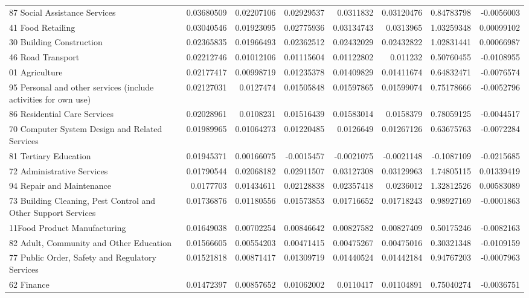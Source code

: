 \documentclass{monashthesis}
\begin{document}
\begin{table}[ht]
{\begin{tabular}{|l|r|rrrr|rr|}
    87 Social Assistance Services & 0.03680509 & 0.02207106 & 0.02929537 & 0.0311832 & 0.03120476 & 0.84783798 & -0.0056003 \\
    41 Food Retailing & 0.03040546 & 0.01923095 & 0.02775936 & 0.03134743 & 0.0313965 & 1.03259348 & 0.00099102 \\
    30 Building Construction & 0.02365835 & 0.01966493 & 0.02362512 & 0.02432029 & 0.02432822 & 1.02831441 & 0.00066987 \\
    46 Road Transport & 0.02212746 & 0.01012106 & 0.01115604 & 0.01122802 & 0.011232 & 0.50760455 & -0.0108955 \\
    01 Agriculture & 0.02177417 & 0.00998719 & 0.01235378 & 0.01409829 & 0.01411674 & 0.64832471 & -0.0076574 \\
    95 Personal and other services (include activities for own use) & 0.02127031 & 0.0127474 & 0.01505848 & 0.01597865 & 0.01599074 & 0.75178666 & -0.0052796 \\
    86 Residential Care Services & 0.02028961 & 0.0108231 & 0.01516439 & 0.01583014 & 0.0158379 & 0.78059125 & -0.0044517 \\
    70 Computer System Design and Related Services & 0.01989965 & 0.01064273 & 0.01220485 & 0.0126649 & 0.01267126 & 0.63675763 & -0.0072284 \\
    81 Tertiary Education & 0.01945371 & 0.00166075 & -0.0015457 & -0.0021075 & -0.0021148 & -0.1087109 & -0.0215685 \\
    72 Administrative Services & 0.01790544 & 0.02068182 & 0.02911507 & 0.03127308 & 0.03129963 & 1.74805115 & 0.01339419 \\
    94 Repair and Maintenance & 0.0177703 & 0.01434611 & 0.02128838 & 0.02357418 & 0.0236012 & 1.32812526 & 0.00583089 \\
    73 Building Cleaning, Pest Control and Other Support Services & 0.01736876 & 0.01180556 & 0.01573853 & 0.01716652 & 0.01718243 & 0.98927169 & -0.0001863 \\
    11Food Product Manufacturing & 0.01649038 & 0.00702254 & 0.00846642 & 0.00827582 & 0.00827409 & 0.50175246 & -0.0082163 \\
    82 Adult, Community and Other Education & 0.01566605 & 0.00554203 & 0.00471415 & 0.00475267 & 0.00475016 & 0.30321348 & -0.0109159 \\
    77 Public Order, Safety and Regulatory Services & 0.01521818 & 0.00871417 & 0.01309719 & 0.01440524 & 0.01442184 & 0.94767203 & -0.0007963 \\
    62 Finance & 0.01472397 & 0.00857652 & 0.01062002 & 0.0110417 & 0.01104891 & 0.75040274 & -0.0036751 \\

\end{tabular}}
\end{table}
\end{document}
